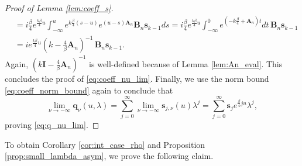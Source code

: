 \documentclass[12pt]{article}
\theoremstyle{definition} %
\theoremstyle{remark} %
\begin{document}
\begin{proof}[Proof of Lemma \ref{lem:coeff_s}]
\begin{align*}
  &=i \frac{\beta}{4}e^{\frac{k \beta}{4} u}\int_{-\infty}^ue^{k \frac{\beta}{4} (s-u)}e^{(u-s)\mathbf{A}_n}\mathbf{B}_n \mathbf{s}_{k-1}ds=i \frac{\beta}{4}e^{\frac{k \beta}{4} u}\int_{-\infty}^0e^{(-k \frac{\beta}{4}+\mathbf{A}_n) t }dt \, \mathbf{B}_n\mathbf{s}_{k-1}
\\&=i e^{\frac{k \beta}{4} u}\left(k-\tfrac{4}{\beta}\mathbf{A}_n\right)^{-1} \, \mathbf{B}_n\mathbf{s}_{k-1}.
\end{align*}
Again, $\left(k \mathbf{I}-\tfrac{4}{\beta}\mathbf{A}_n\right)^{-1}$ is well-defined because of Lemma \ref{lem:An_eval}. This concludes the proof of \eqref{eq:coeff_nu_lim}. Finally, we use the norm bound \eqref{eq:coeff_norm_bound} again to conclude that 
\[
 \lim_{\nu\to -\infty} \mathbf{q}_{\nu}(u,\lambda)=
\sum_{j=0}^\infty \lim_{\nu\to -\infty} \mathbf{s}_{j,\nu}(u) \lambda^j
 =
 \sum_{j=0}^\infty \mathbf{s}_j e^{\frac{\beta}{4} j u} \lambda^j,
\]
proving \eqref{eq:q_nu_lim}.
\end{proof}
To obtain Corollary \ref{cor:int_case_rho} and Proposition \ref{prop:small_lambda_asym}, we prove the following claim. 
\end{document}
